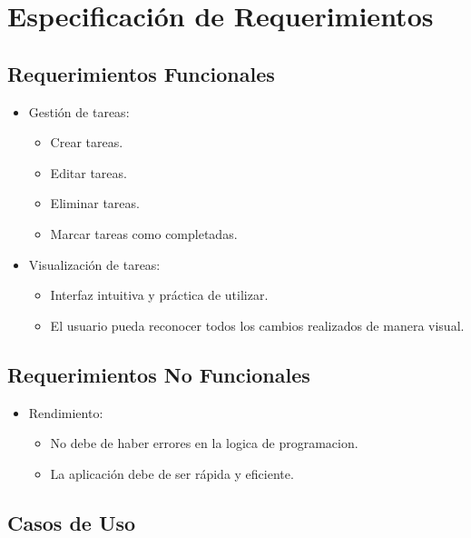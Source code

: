 	\chapter{Especificación de Requerimientos}
	\section{Requerimientos Funcionales}
    \begin{itemize}
        \item Gestión de tareas:
        \begin{itemize}
            \item Crear tareas.
            \item Editar tareas.
            \item Eliminar tareas.
            \item Marcar tareas como completadas.
        \end{itemize}
        \item Visualización de tareas:
        \begin{itemize}
            \item Interfaz intuitiva y práctica de utilizar.
            \item El usuario pueda reconocer todos los cambios realizados de manera visual.
        \end{itemize}
    \end{itemize}
	
	\section{Requerimientos No Funcionales}
	\begin{itemize}
        \item Rendimiento:
        \begin{itemize}
            \item No debe de haber errores en la logica de programacion.
            \item La aplicación debe de ser rápida y eficiente.
        \end{itemize}
    \end{itemize}
	
	\section{Casos de Uso}
	
